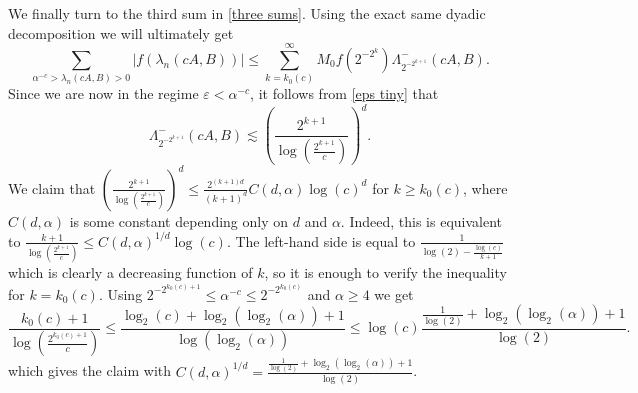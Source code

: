\documentclass[12pt]{amsart}
\numberwithin{equation}{section}
\newcommand{\eps}{\varepsilon}
\begin{document}
We finally turn to the third sum in \eqref{three sums}. Using the exact same dyadic decomposition we will ultimately get
\begin{equation}\label{log log or log 2 or loglog2}
\sum_{\alpha^{-c}>\lambda_n(cA,B) >0}|f(\lambda_n(cA,B))| \le \sum_{k=k_0(c)}^\infty M_0 f\left(2^{-2^k}\right) \Lambda_{2^{-2^{k+1}}}^-(cA,B).
\end{equation}
Since we are now in the regime $\eps < \alpha^{-c}$, it follows from \eqref{eps tiny} that
$$\Lambda_{2^{-2^{k+1}}}^-(cA,B) \lesssim  \left(\frac{2^{k+1}}{\log(\frac{2^{k+1}}{c})}\right)^d.$$
 We claim that $\left(\frac{2^{k+1}}{\log\left(\frac{2^{k+1}}{c}\right)}\right)^d\le \frac{2^{(k+1)d}}{(k+1)^d}C(d,\alpha)\log(c)^d$ for $k \ge k_0(c)$, where $C(d,\alpha)$ is some constant depending only on $d$ and $\alpha$. Indeed, this is equivalent to $\frac{k+1}{\log\left(\frac{2^{k+1}}{c}\right)} \le C(d,\alpha)^{1/d}\log(c)$. The left-hand side is equal to $\frac{1}{\log(2)-\frac{\log(c)}{k+1}}$ which is clearly a decreasing function of $k$, so it is enough to verify the inequality for $k = k_0(c)$. Using $2^{-2^{k_0(c)+1}}\le \alpha^{-c}\le 2^{-2^{k_0(c)}}$ and $\alpha \ge 4$ we get 
$$\frac{k_0(c)+1}{\log\left(\frac{2^{k_0(c)+1}}{c}\right)}  \le \frac{\log_2(c)+\log_2 (\log_2(\alpha))+1}{\log(\log_2(\alpha))}\le \log(c) \frac{\frac{1}{\log(2)}+\log_2(\log_2(\alpha)) + 1}{\log(2)}.$$
which gives the claim with $C(d,\alpha)^{1/d}=\frac{\frac{1}{\log(2)}+\log_2(\log_2(\alpha)) + 1}{\log(2)}$.
\end{document}
